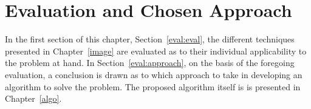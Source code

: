 
\cleardoublepage
\chapter{Evaluation and Chosen Approach}
\label{eval}

In the first section of this chapter, Section~\ref{eval:eval}, the
different techniques presented in Chapter~\ref{image} are evaluated as
to their individual applicability to the problem at hand.  In
Section~\ref{eval:approach}, on the basis of the foregoing evaluation,
a conclusion is drawn as to which approach to take in developing an
algorithm to solve the problem.  The proposed algorithm itself is is
presented in Chapter~\ref{algo}.



